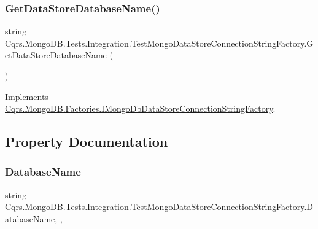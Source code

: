 \subsubsection{\texorpdfstring{Get\+Data\+Store\+Database\+Name()}{GetDataStoreDatabaseName()}}
{\footnotesize\ttfamily string Cqrs.\+Mongo\+D\+B.\+Tests.\+Integration.\+Test\+Mongo\+Data\+Store\+Connection\+String\+Factory.\+Get\+Data\+Store\+Database\+Name (\begin{DoxyParamCaption}{ }\end{DoxyParamCaption})}



Implements \hyperlink{interfaceCqrs_1_1MongoDB_1_1Factories_1_1IMongoDbDataStoreConnectionStringFactory_aca9921fae4214a9eb22a221825c57363}{Cqrs.\+Mongo\+D\+B.\+Factories.\+I\+Mongo\+Db\+Data\+Store\+Connection\+String\+Factory}.



\subsection{Property Documentation}
\mbox{\label{classCqrs_1_1MongoDB_1_1Tests_1_1Integration_1_1TestMongoDataStoreConnectionStringFactory_a2d26a00fd14aad6718b48d515ac30ff9}} 
\subsubsection{\texorpdfstring{Database\+Name}{DatabaseName}}
{\footnotesize\ttfamily string Cqrs.\+Mongo\+D\+B.\+Tests.\+Integration.\+Test\+Mongo\+Data\+Store\+Connection\+String\+Factory.\+Database\+Name\hspace{0.3cm}{\ttfamily [static]}, {\ttfamily [get]}, {\ttfamily [set]}}

